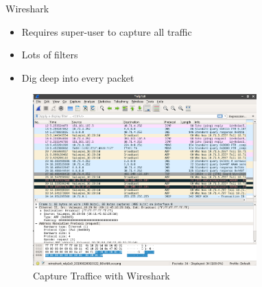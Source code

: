 \begin{frame}
   {Wireshark}
      \begin{itemize}
         \item Requires super-user to capture all traffic
	 \item Lots of filters
	 \item Dig deep into every packet
      \end{itemize}
      \begin{figure}[H]
         \includegraphics[width=3.4in]{IMAGES/wireshark}
         \caption{Capture Traffice with Wireshark}
      \end{figure}


\end{frame}

\cprotect\note{

}

